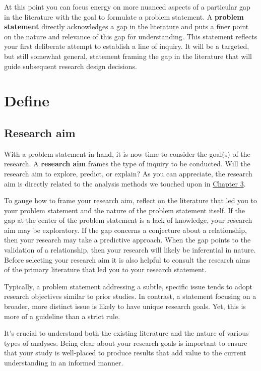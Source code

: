 \documentclass[
  letterpaper,
  krantz1]{latex/krantz-mod}
\theoremstyle{definition}
\theoremstyle{definition}
\theoremstyle{remark}
\begin{document}
At this point you can focus energy on more nuanced aspects of a
particular gap in the literature with the goal to formulate a problem
statement. A \textbf{problem statement}
directly acknowledges a gap in the literature and puts a finer point on
the nature and relevance of this gap for understanding. This statement
reflects your first deliberate attempt to establish a line of inquiry.
It will be a targeted, but still somewhat general, statement framing the
gap in the literature that will guide subsequent research design
decisions.

\section{Define}\label{sec-research-define}

\subsection{Research aim}\label{sec-research-aim}

With a problem statement in hand, it is now time to consider the goal(s)
of the research. A \textbf{research aim} frames the
type of inquiry to be conducted. Will the research aim to explore,
predict, or explain? As you can appreciate, the research aim is directly
related to the analysis methods we touched upon in
\hyperref[sec-approaching-analysis]{Chapter 3}.

To gauge how to frame your research aim, reflect on the literature that
led you to your problem statement and the
nature of the problem statement itself. If the gap at the center of the
problem statement is a lack of knowledge, your research aim may be
exploratory. If the gap concerns a conjecture about a relationship, then
your research may take a predictive approach. When the gap points to the
validation of a relationship, then your research will likely be
inferential in nature. Before selecting your research aim it is also
helpful to consult the research aims of the primary literature that led
you to your research statement.

Typically, a problem statement addressing a subtle, specific issue tends
to adopt research objectives similar to prior studies. In contrast, a
statement focusing on a broader, more distinct issue is likely to have
unique research goals. Yet, this is more of a guideline than a strict
rule.

It's crucial to understand both the existing literature and the nature
of various types of analyses. Being clear about your research goals is
important to ensure that your study is well-placed to produce results
that add value to the current understanding in an informed manner.
\end{document}
